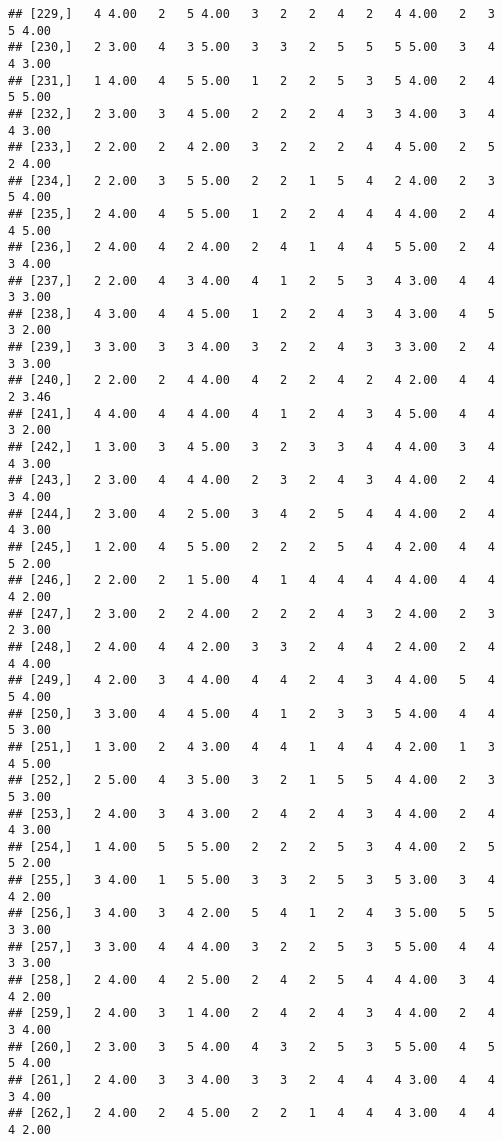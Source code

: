 \documentclass[]{article}
\begin{document}
\begin{verbatim}
## [229,]   4 4.00   2   5 4.00   3   2   2   4   2   4 4.00   2   3   5 4.00
## [230,]   2 3.00   4   3 5.00   3   3   2   5   5   5 5.00   3   4   4 3.00
## [231,]   1 4.00   4   5 5.00   1   2   2   5   3   5 4.00   2   4   5 5.00
## [232,]   2 3.00   3   4 5.00   2   2   2   4   3   3 4.00   3   4   4 3.00
## [233,]   2 2.00   2   4 2.00   3   2   2   2   4   4 5.00   2   5   2 4.00
## [234,]   2 2.00   3   5 5.00   2   2   1   5   4   2 4.00   2   3   5 4.00
## [235,]   2 4.00   4   5 5.00   1   2   2   4   4   4 4.00   2   4   4 5.00
## [236,]   2 4.00   4   2 4.00   2   4   1   4   4   5 5.00   2   4   3 4.00
## [237,]   2 2.00   4   3 4.00   4   1   2   5   3   4 3.00   4   4   3 3.00
## [238,]   4 3.00   4   4 5.00   1   2   2   4   3   4 3.00   4   5   3 2.00
## [239,]   3 3.00   3   3 4.00   3   2   2   4   3   3 3.00   2   4   3 3.00
## [240,]   2 2.00   2   4 4.00   4   2   2   4   2   4 2.00   4   4   2 3.46
## [241,]   4 4.00   4   4 4.00   4   1   2   4   3   4 5.00   4   4   3 2.00
## [242,]   1 3.00   3   4 5.00   3   2   3   3   4   4 4.00   3   4   4 3.00
## [243,]   2 3.00   4   4 4.00   2   3   2   4   3   4 4.00   2   4   3 4.00
## [244,]   2 3.00   4   2 5.00   3   4   2   5   4   4 4.00   2   4   4 3.00
## [245,]   1 2.00   4   5 5.00   2   2   2   5   4   4 2.00   4   4   5 2.00
## [246,]   2 2.00   2   1 5.00   4   1   4   4   4   4 4.00   4   4   4 2.00
## [247,]   2 3.00   2   2 4.00   2   2   2   4   3   2 4.00   2   3   2 3.00
## [248,]   2 4.00   4   4 2.00   3   3   2   4   4   2 4.00   2   4   4 4.00
## [249,]   4 2.00   3   4 4.00   4   4   2   4   3   4 4.00   5   4   5 4.00
## [250,]   3 3.00   4   4 5.00   4   1   2   3   3   5 4.00   4   4   5 3.00
## [251,]   1 3.00   2   4 3.00   4   4   1   4   4   4 2.00   1   3   4 5.00
## [252,]   2 5.00   4   3 5.00   3   2   1   5   5   4 4.00   2   3   5 3.00
## [253,]   2 4.00   3   4 3.00   2   4   2   4   3   4 4.00   2   4   4 3.00
## [254,]   1 4.00   5   5 5.00   2   2   2   5   3   4 4.00   2   5   5 2.00
## [255,]   3 4.00   1   5 5.00   3   3   2   5   3   5 3.00   3   4   4 2.00
## [256,]   3 4.00   3   4 2.00   5   4   1   2   4   3 5.00   5   5   3 3.00
## [257,]   3 3.00   4   4 4.00   3   2   2   5   3   5 5.00   4   4   3 3.00
## [258,]   2 4.00   4   2 5.00   2   4   2   5   4   4 4.00   3   4   4 2.00
## [259,]   2 4.00   3   1 4.00   2   4   2   4   3   4 4.00   2   4   3 4.00
## [260,]   2 3.00   3   5 4.00   4   3   2   5   3   5 5.00   4   5   5 4.00
## [261,]   2 4.00   3   3 4.00   3   3   2   4   4   4 3.00   4   4   3 4.00
## [262,]   2 4.00   2   4 5.00   2   2   1   4   4   4 3.00   4   4   4 2.00

\end{verbatim}
\end{document}
